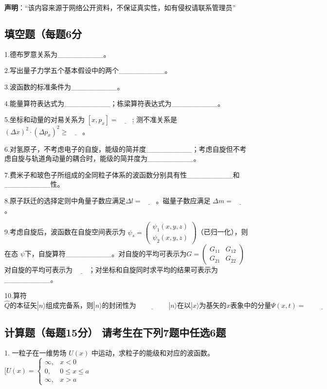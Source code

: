 
\textbf{声明}：“该内容来源于网络公开资料，不保证真实性，如有侵权请联系管理员”

\subsection{填空题（每题6分}

1.德布罗意关系为_________。

2.写出量子力学五个基本假设中的两个_________。

3.波函数的标准条件为_________。

4.能量算符表达式为_________；栋梁算符表达式为_________。

5.坐标和动量的对易关系为 $[x, p_x] = \underline{\quad\quad}$;
          测不准关系是 $(\Delta x)^2 \cdot (\Delta p_x)^2 \geq \underline{\quad\quad}$。

6.对氢原子，不考虑电子的自旋，能级的简并度_________；考虑自旋但不考虑自旋与轨道角动量的耦合时，能级的简并度为_________。

7.费米子和玻色子所组成的全同粒子体系的波函数分别具有性_________和_________性。

8.原子跃迁的选择定则中角量子数应满足$\Delta l = \underline{\quad\quad}$。磁量子数应满足 $\Delta m = \underline{\quad\quad}$。

9.考虑自旋后，波函数在自旋空间表示为 $\psi_s = \begin{pmatrix} \psi_1(x, y, z) \\ \psi_2(x, y, z) \end{pmatrix}$（已归一化），则在态 $\psi$下，自旋算符_________。对自旋的平均可表示为$G = \begin{pmatrix} G_{11} & G_{12} \\ G_{21} & G_{22} \end{pmatrix}$ 对自旋的平均可表示为 $\underline{\quad\quad}$；对坐标和自旋同时求平均的结果可表示为_________。

10.算符$\hat{Q}\text{的本征矢}|n\rangle \text{组成完备系，则}|n\rangle \text{的封闭性为} \underline{\hspace{2cm}}
|n\rangle \text{在以}|x\rangle \text{为基矢的} x \text{表象中的分量}\Psi(x,t)=\underline{\hspace{2cm}}$

\subsection{计算题（每题15分） 请考生在下列7题中任选6题}

1. 一粒子在一维势场 $U(x)$ 中运动，求粒子的能级和对应的波函数。
$[ U(x) = \begin{cases} \infty, & x < 0 \\0, & 0 \le x \le a \\\infty, & x > a \end{cases}$
